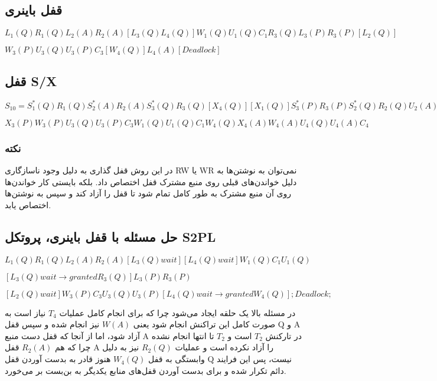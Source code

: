 \subsection*{قفل باینری}

\begin{LTR}
\centering
$L_1(Q)R_1(Q)L_2(A)R_2(A)[L_3(Q)L_4(Q)]W_1(Q)U_1(Q)C_1R_3(Q)L_3(P)R_3(P)[L_2(Q)]$

$W_3(P)U_3(Q)U_3(P)C_3[W_4(Q)]L_4(A)[Deadlock]$
\end{LTR}

\subsection*{قفل S/X}

\begin{LTR}
\centering
$S_10 = S_1^*(Q)R_1(Q) S_2^*(A)R_2(A) S_3^*(Q)R_3(Q) [X_4(Q)][X_1(Q)]S_3^*(P)R_3(P) S_2^*(Q)R_2(Q) U_2(A)U_2(Q)C2$

$X_3(P)W_3(P) U_3(Q)U_3(P)C_3W_1(Q)U_1(Q)C_1W_4(Q)X_4(A)W_4(A)U_4(Q)U_4(A)C_4$
\end{LTR}

\subsubsection*{نکته}

در این روش قفل گذاری به دلیل وجود ناسازگاری RW یا WR نمی‌توان به نوشتن‌ها به
دلیل خواندن‌های قبلی روی منبع مشترک قفل اختصاص داد. بلکه بایستی کار خواندن‌ها
روی آن منبع مشترک به طور کامل تمام شود تا قفل را آزاد کند و سپس به نوشتن‌ها
اختصاص یابد.

\subsection*{حل مسئله با قفل باینری، پروتکل S2PL}

\begin{LTR}
    \centering
    $L_1(Q)R_1(Q)L_2(A)R_2(A)[L_3(Q) wait][L_4(Q) wait]W_1(Q)C_1U_1(Q)$

    $[L_3(Q) wait \rightarrow granted R_3(Q)]L_3(P)R_3(P)$

    $[L_2(Q) wait]W_3(P)C_3U_3(Q)U_3(P)[L_4(Q) wait \rightarrow granted W_4(Q)];Deadlock;$
\end{LTR}

در مسئله بالا یک حلقه ایجاد می‌شود چرا که برای انجام کامل عملیات $T_4$ نیاز است
به صورت کامل این تراکنش انجام شود یعنی $W(A)$ نیز انجام شده و سپس قفل Q و A آزاد
شود، اما از آنجا که قفل دست منبع A در تارکنش $T_2$ است و $T_2$ تا انتها انجام
نشده چرا که هم $R_2(A)$ قفل A را آزاد نکرده است و عملیات $R_2(Q)$ نیز به دلیل
وابستگی به قفل $W_4(Q)$ هنوز قادر به بدست آوردن قفل Q نیست، پس این فرایند دائم
تکرار شده و برای بدست آوردن قفل‌های منابع یکدیگر به بن‌بست بر می‌خورد.

\newpage